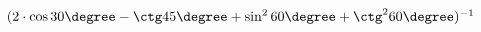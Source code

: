 \begin{ex}[type=calculate]
	\begin{condition}
		\( (2\cdot\cos30\degree-\ctg45\degree+\sin^2 60\degree + \ctg^2 60\degree)^{-1} \)
	\end{condition}
\end{ex}